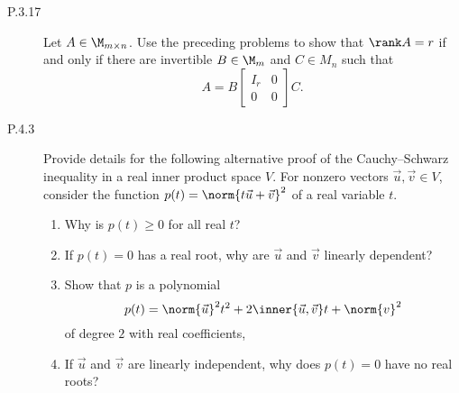 \documentclass{homework}
\date{Tuesday 2/5}
\author{}
\begin{document}
\begin{description}
\item[P.3.17]
  Let \(A \in \M_{m\times n}\).  Use the preceding problems to show
  that \(\rank A = r\) if and only if there are invertible
  \(B \in \M_m\) and \(C \in M_n\) such that
  \[
    A = B
    \begin{bmatrix}
      I_r & 0 \\
      0   & 0
    \end{bmatrix}
    C.
  \]

  \begin{solution}

  \end{solution}

\item[P.4.3]
  Provide details for the following alternative proof of the
  Cauchy--Schwarz inequality in a real inner product space \(V\).  For
  nonzero vectors \(\vec u, \vec v \in V\), consider the function
  \(p(t) = \norm{t \vec u + \vec v}^2\) of a real variable \(t\).
  \begin{enumerate}
  \item Why is \(p(t) \ge 0\) for all real \(t\)?

    \begin{solution}

    \end{solution}

  \item If \(p(t) = 0\) has a real root, why are \(\vec u\) and
    \(\vec v\) linearly dependent?

    \begin{solution}

    \end{solution}

  \item Show that \(p\) is a polynomial
    \[
      p(t) =
      \norm{\vec u}^2 t^2        +
      2 \inner{\vec u, \vec v} t +
      \norm{v}^2
    \]
    of degree \(2\) with real coefficients,

    \begin{solution}

    \end{solution}

  \item If \(\vec u\) and \(\vec v\) are linearly independent, why
    does \(p(t) = 0\) have no real roots?

    \begin{solution}


\end{solution}
\end{enumerate}
\end{description}
\end{document}
